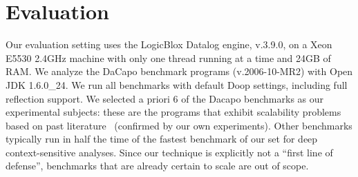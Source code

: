 \section{Evaluation}

Our evaluation setting uses the LogicBlox Datalog engine, v.3.9.0, on
a Xeon E5530 2.4GHz machine with only one thread running at a time and
24GB of RAM. We analyze the DaCapo benchmark programs (v.2006-10-MR2)
with Open JDK 1.6.0\_24. We run all benchmarks with default Doop
settings, including full reflection support.
We selected a priori 6 of the Dacapo benchmarks as our experimental
subjects: these are the programs that exhibit scalability problems
based on past literature~\cite{hybrid-pldi13} (confirmed by our own
experiments). Other benchmarks typically run in half the time of the
fastest benchmark of our set for deep context-sensitive analyses.
Since our technique is explicitly not a ``first line of defense'',
benchmarks that are already certain to scale are out of scope.


